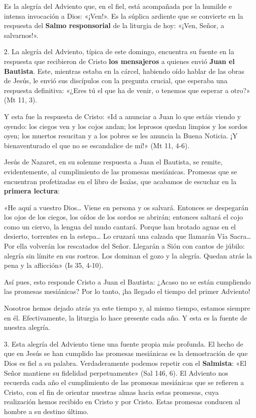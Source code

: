 \documentclass[]{article}
\begin{document}
Es la alegría del Adviento que, en el fiel, está acompañada por la
humilde e intensa invocación a Dios: «¡Ven!». Es la súplica ardiente que
se convierte en la respuesta del \textbf{Salmo responsorial} de la
liturgia de hoy: «¡Ven, Señor, a salvarnos!».

2. La alegría del Adviento, típica de este domingo, encuentra su fuente
en la respuesta que recibieron de Cristo \textbf{los mensajeros} a
quienes envió \textbf{Juan el Bautista}. Este, mientras estaba en la
cárcel, habiendo oído hablar de las obras de Jesús, le envió sus
discípulos con la pregunta crucial, que esperaba una respuesta
definitiva: «¿Eres tú el que ha de venir, o tenemos que esperar a otro?»
(Mt 11, 3).

Y esta fue la respuesta de Cristo: «Id a anunciar a Juan lo que estáis
viendo y oyendo: los ciegos ven y los cojos andan; los leprosos quedan
limpios y los sordos oyen; los muertos resucitan y a los pobres se les
anuncia la Buena Noticia. ¡Y bienaventurado el que no se escandalice de
mí!» (Mt 11, 4-6).

Jesús de Nazaret, en su solemne respuesta a Juan el Bautista, se remite,
evidentemente, al cumplimiento de las promesas mesiánicas. Promesas que
se encuentran profetizadas en el libro de Isaías, que acabamos de
escuchar en la \textbf{primera lectura}:

«He aquí a vuestro Dios\ldots{} Viene en persona y os salvará. Entonces
se despegarán los ojos de los ciegos, los oídos de los sordos se
abrirán; entonces saltará el cojo como un ciervo, la lengua del mudo
cantará. Porque han brotado aguas en el desierto, torrentes en la
estepa\ldots{} Lo cruzará una calzada que llamarán Vía Sacra\ldots{} Por
ella volverán los rescatados del Señor. Llegarán a Sión con cantos de
júbilo: alegría sin límite en sus rostros. Los dominan el gozo y la
alegría. Quedan atrás la pena y la aflicción» (Is 35, 4-10).

Así pues, esto responde Cristo a Juan el Bautista: ¿Acaso no se están
cumpliendo las promesas mesiánicas? Por lo tanto, ¡ha llegado el tiempo
del primer Adviento!

Nosotros hemos dejado atrás ya este tiempo y, al mismo tiempo, estamos
siempre en él. Efectivamente, la liturgia lo hace presente cada año. Y
esta es la fuente de nuestra alegría.

3. Esta alegría del Adviento tiene una fuente propia más profunda. El
hecho de que en Jesús se han cumplido las promesas mesiánicas es la
demostración de que Dios es fiel a su palabra. Verdaderamente podemos
repetir con el \textbf{Salmista}: «El Señor mantiene su fidelidad
perpetuamente» (Sal 146, 6). El Adviento nos recuerda cada año el
cumplimiento de las promesas mesiánicas que se refieren a Cristo, con el
fin de orientar nuestras almas hacia estas promesas, cuya realización
hemos recibido en Cristo y por Cristo. Estas promesas conducen al hombre
a su destino último.
\end{document}

